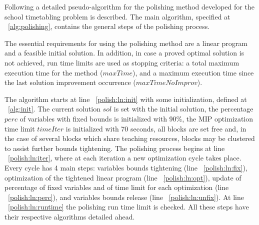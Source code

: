 Following a detailed pseudo-algorithm for the polishing method developed for the school timetabling problem is described. The main algorithm, specified at ~\ref{alg:polishing}, contains the general steps of the polishing process.

The essential requirements for using the polishing method are a linear program and a feasible initial solution. In addition, in case a proved optimal solution is not achieved, run time limits are used as stopping criteria: a total maximum execution time for the method ($maxTime$), and a maximum execution time since the last solution improvement occurrence ($maxTimeNoImprov$).

The algorithm starts at line ~\ref{polish:ln:init} with some initialization, defined at ~\ref{alg:init}. The current solution $sol$ is set with the initial solution, the percentage $perc$ of variables with fixed bounds is initialized with 90\%, the MIP optimization time limit $timeIter$ is initialized with 70 seconds, all blocks are set free and, in the case of several blocks which share teaching resources, blocks may be clustered to assist further bounds tightening. The polishing process begins at line ~\ref{polish:ln:iter}, where at each iteration a new optimization cycle takes place. Every cycle has 4 main steps: variables bounds tightening (line ~\ref{polish:ln:fix}), optimization of the tightened linear program (line ~\ref{polish:ln:opt}), update of percentage of fixed variables and of time limit for each optimization (line ~\ref{polish:ln:perc}), and variables bounds release (line ~\ref{polish:ln:unfix}). At line ~\ref{polish:ln:runtime} the polishing run time limit is checked. All these steps have their respective algorithms detailed ahead.

